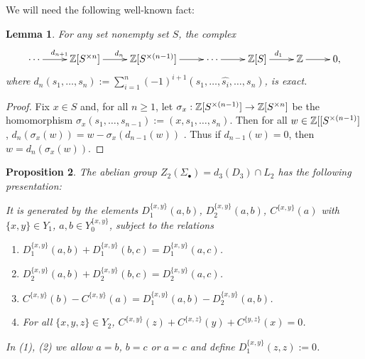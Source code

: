 \documentclass[12pt]{amsart}
\newtheorem{lem}{Lemma}[section]
\newtheorem{prop}[lem]{Proposition}
\theoremstyle{definition}
\newcommand{\Z}{\Bbb{Z}}
\newcommand{\<}{\langle}
\renewcommand{\>}{\rangle}
\begin{document}
We will need the following well-known fact:
\begin{lem}\label{lem:exact} For any set nonempty set $S$, the complex
\[
\xymatrix{
\cdots\ar^{d_{n+1}}[r]&\Z[S^{\times n}]\ar^{d_n}[r]&\Z[S^{\times (n-1)}]\ar[r]&\cdots\ar[r]&\Z[S]\ar^{d_1}[r]&\Z\ar[r]&0,
}
\]
where $d_n(s_1,\ldots,s_n):=\sum_{i=1}^n(-1)^{i+1}(s_1,\ldots,\widehat{s_i},\ldots,s_n)$, is exact.
\end{lem}
\begin{proof} Fix $x\in S$ and, for all $n\geq 1$, let $\sigma_x:\Z[S^{\times (n-1)}]\to\Z[S^{\times n}]$ be the homomorphism $\sigma_x(s_1,\ldots,s_{n-1}):=(x,s_1,\ldots,s_n)$. Then for 
all $w\in \Z[[S^{\times (n-1)}]$, $d_n(\sigma_x(w))=w-\sigma_x(d_{n-1}(w))$ . Thus if $d_{n-1}(w)=0$, then $w=d_n(\sigma_x(w))$.
\end{proof}
\begin{prop}\label{prop:pres}
The abelian group $Z_2(\Sigma_\bullet)=d_3(D_3)\cap L_2$ has the following presentation: 

It is generated by the elements  $D_1^{\{x,y\}}(a,b)$, $D_2^{\{x,y\}}(a,b)$, $C^{\{ x,y\}}(a)$ with $\{ x,y\}\in Y_1$, $a,b\in Y^{\{ x,y\}}_0$, subject to the relations
\begin{enumerate}
\item $D_1^{\{ x,y\}}(a,b)+D_1^{\{ x,y\}}(b,c)=D_1^{\{ x,y\}}(a,c)$.
\item  $D_2^{\{ x,y\}}(a,b)+D_2^{\{ x,y\}}(b,c)=D_2^{\{ x,y\}}(a,c)$.
\item $C^{\{ x,y\}}(b)-C^{\{ x,y\}}(a)=D_1^{\{ x,y\}}(a,b)-D_2^{\{ x,y\}}(a,b)$.
\item For all $\{ x,y,z\}\in Y_2$, $C^{\{ x,y\}}(z)+C^{\{ x,z\}}(y)+C^{\{ y,z\}}(x)=0$.
\end{enumerate}
In (1), (2) we allow $a=b$, $b=c$ or $a=c$ and define $D_1^{\{ x,y\}}(z,z):=0$.
\end{prop}
\end{document}
